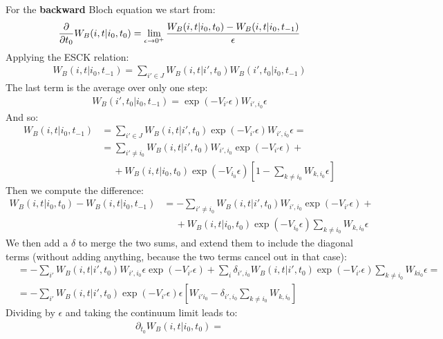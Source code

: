 \documentclass[../template.tex]{subfiles}
\begin{document}
\begin{exo}
    For the \textbf{backward} Bloch equation we start from:
    \begin{align*}
        \pdv{t_0} W_B(i,t|i_0,t_0) = \lim_{\epsilon \to 0^+} \frac{W_B(i,t|i_0,t_0) - W_B(i,t|i_0,t_{-1})}{\epsilon} 
    \end{align*}
    Applying the ESCK relation:
    \begin{align*}
        W_B(i,t|i_0,t_{-1}) = \sum_{i' \in J} W_B(i,t|i',t_0) W_B(i',t_0|i_0,t_{-1})
    \end{align*}
    The last term is the average over only one step:
    \begin{align*}
        W_B(i',t_0|i_0,t_{-1}) = \exp(-V_{i'}\epsilon) W_{i',i_0} \epsilon
    \end{align*}
    And so:
    \begin{align*}
        W_B(i,t|i_0,t_{-1}) &= \sum_{i' \in J} W_B(i,t|i',t_0)\exp(-V_{i'}\epsilon) W_{i',i_0} \epsilon =\\
        &=\sum_{i' \neq i_0} W_B(i,t|i',t_0) W_{i',i_0} \exp(-V_{i'} \epsilon) +\\
        &\quad \> +W_B(i,t|i_0,t_0) \exp(-V_{i_0} \epsilon) \left[1 - \sum_{k \neq i_0} W_{k,i_0} \epsilon\right]
    \end{align*}
    Then we compute the difference:
    \begin{align*}
        W_B(i,t|i_0,t_0) - W_B(i,t|i_0,t_{-1}) &= -\sum_{i' \neq i_0} W_B(i,t|i',t_0) W_{i',i_0} \exp(-V_{i'} \epsilon) +\\
        &\quad \> +W_B(i,t|i_0,t_0) \exp(-V_{i_0} \epsilon)  \sum_{k \neq i_0} W_{k,i_0} \epsilon
    \end{align*}
    We then add a $\delta$ to merge the two sums, and extend them to include the diagonal terms (without adding anything, because the two terms cancel out in that case):
    \begin{align*}
        &= -\sum_{i'} W_B(i,t|i',t_0) W_{i',i_0} \epsilon \exp(-V_{i'} \epsilon) + \sum_{i} \delta_{i',i_0} W_B(i,t|i',t_0) \exp(-V_{i'}\epsilon) \sum_{k \neq i_0} W_{k i_0} \epsilon =\\
        &= -\sum_{i'} W_B(i,t|i',t_0) \exp(-V_{i'}\epsilon) \epsilon[W_{i' i_0} - \delta_{i',i_0} \sum_{k \neq i_0} W_{k,i_0}] 
    \end{align*}
    Dividing by $\epsilon$ and taking the continuum limit leads to:
    \begin{align*}
        \partial_{t_0} W_B(i,t|i_0,t_0) = 
    \end{align*}


\end{exo}
\end{document}
